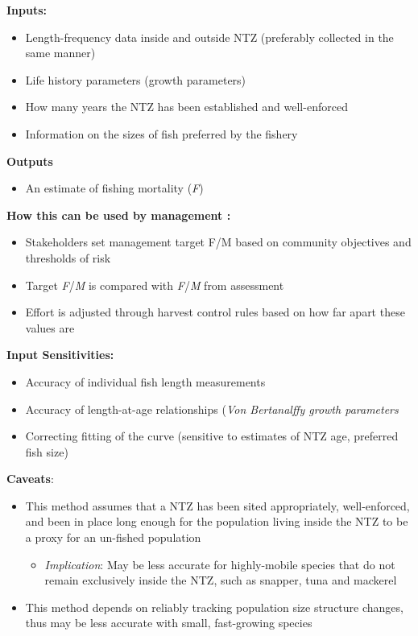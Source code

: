 \documentclass[]{book}
\providecommand{\tightlist}{%
  \setlength{\itemsep}{0pt}\setlength{\parskip}{0pt}}
\begin{document}
\textbf{Inputs:}

\begin{itemize}
\item
  Length-frequency data inside and outside NTZ (preferably collected in
  the same manner)
\item
  Life history parameters (growth parameters)
\item
  How many years the NTZ has been established and well-enforced
\item
  Information on the sizes of fish preferred by the fishery
\end{itemize}

\textbf{Outputs}

\begin{itemize}
\tightlist
\item
  An estimate of fishing mortality (\emph{F})
\end{itemize}

\textbf{How this can be used by management :}

\begin{itemize}
\item
  Stakeholders set management target F/M based on community objectives
  and thresholds of risk
\item
  Target \emph{F}/\emph{M} is compared with \emph{F}/\emph{M} from
  assessment
\item
  Effort is adjusted through harvest control rules based on how far
  apart these values are
\end{itemize}

\textbf{Input Sensitivities: }

\begin{itemize}
\item
  Accuracy of individual fish length measurements
\item
  Accuracy of length-at-age relationships (\emph{Von Bertanalffy growth
  parameters}
\item
  Correcting fitting of the curve (sensitive to estimates of NTZ age,
  preferred fish size)
\end{itemize}

\textbf{Caveats}:

\begin{itemize}
\item
  This method assumes that a NTZ has been sited appropriately,
  well-enforced, and been in place long enough for the population living
  inside the NTZ to be a proxy for an un-fished population

  \begin{itemize}
  \tightlist
  \item
    \emph{Implication}: May be less accurate for highly-mobile species
    that do not remain exclusively inside the NTZ, such as snapper, tuna
    and mackerel
  \end{itemize}
\item
  This method depends on reliably tracking population size structure
  changes, thus may be less accurate with small, fast-growing species
\end{itemize}
\end{document}
